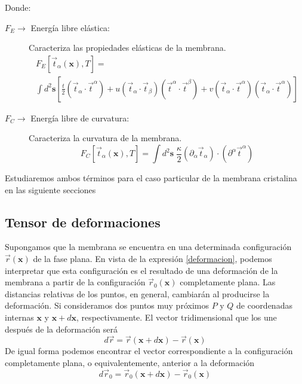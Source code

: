 Donde:
\begin{description}
\item[ $F_E\rightarrow $ Energía libre elástica:] Caracteriza las propiedades elásticas de la membrana.
  \begin{multline}
    F_E[\vec{t}_{\alpha}(\mathbf{x}),T]=\\\int d^2\mathbf{s}
    \left[
      \frac{t}{2}(\vec{t}_{\alpha}\cdot\vec{t}^{\alpha})+
      u(\vec{t}_{\alpha}\cdot\vec{t}_{\beta})(\vec{t}^{\alpha}\cdot\vec{t}^{\beta})+
      v(\vec{t}_{\alpha}\cdot\vec{t}^{\alpha})(\vec{t}_{\alpha}\cdot\vec{t}^{\alpha})\right]
  \end{multline}
\item[ $F_C\rightarrow $ Energía libre de curvatura:] Caracteriza la curvatura
  de la membrana. 
  \begin{equation}
       F_C[\vec{t}_{\alpha}(\mathbf{x}),T]=\int d^2\mathbf{s}\; 
      \frac{\kappa}{2}(\partial_{\alpha}\vec{t}_{\alpha})\cdot(\partial^{\alpha}\vec{t}^{\alpha})
  \end{equation}
\end{description}

Estudiaremos ambos términos para el caso particular de la membrana cristalina
en las siguiente secciones

\subsection{Tensor de deformaciones}

Supongamos que la membrana se encuentra en una determinada configuración
$\vec{r}(\mathbf{x})$ de la fase plana. En vista de la expresión
\eqref{deformacion}, podemos interpretar que esta configuración es el
resultado de una deformación de la membrana a partir de la configuración
$\vec{r}_0(\mathbf{x})$ completamente plana. Las distancias relativas de los
puntos, en general, cambiarán al producirse la deformación. Si
consideramos dos puntos muy próximos $P$ y $Q$ de coordenadas internas
$\mathbf{x}$ y $\mathbf{x}+d\mathbf{x}$, respectivamente. El vector tridimensional que los une
después de la deformación será
\begin{equation}\label{dr}
d\vec{r}= \vec{r}(\mathbf{x}+d\mathbf{x})-\vec{r}(\mathbf{x})
\end{equation}
De igual forma podemos encontrar el vector correspondiente a la configuración
completamente plana, o equivalentemente, anterior a la deformación
\begin{equation}\label{dr0}
d\vec{r}_0= \vec{r}_0(\mathbf{x}+d\mathbf{x})-\vec{r}_0(\mathbf{x})
\end{equation}

